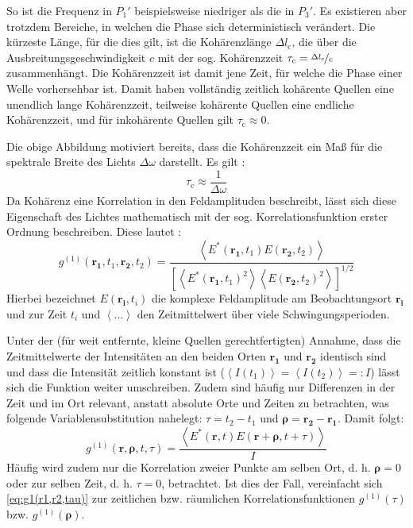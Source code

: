 So ist die Frequenz in $P_1'$ beispielsweise niedriger als die in $P_3'$. 
Es existieren aber trotzdem Bereiche, in welchen die Phase sich deterministisch verändert. 
Die kürzeste Länge, für die dies gilt, ist die Kohärenzlänge $\Delta l_\mathrm{c}$, die über die Ausbreitungsgeschwindigkeit $c$ mit der sog. Kohärenzzeit $\tau_{\mathrm{c}}= \nicefrac{\Delta l_\mathrm{c}}{c}$ zusammenhängt. 
Die Kohärenzzeit ist damit jene Zeit, für welche die Phase einer Welle vorhersehbar ist. 
Damit haben vollständig zeitlich kohärente Quellen eine unendlich lange Kohärenzzeit, teilweise kohärente Quellen eine endliche Kohärenzzeit, und für inkohärente Quellen gilt $\tau_{\mathrm{c}}\approx 0$. 

Die obige Abbildung motiviert bereits, dass die Kohärenzzeit ein Maß für die spektrale Breite des Lichts $\Delta \omega$ darstellt. 
Es gilt \cite{foxQuantumOpticsIntroduction2006}:
\begin{equation}
    \tau_{\mathrm{c}}  \approx \frac{1}{\Delta \omega}
    \label{eq:tau(delta nu)}
\end{equation}
Da Kohärenz eine Korrelation in den Feldamplituden beschreibt, lässt sich diese Eigenschaft des Lichtes mathematisch mit der sog. Korrelationsfunktion erster Ordnung beschreiben. 
Diese lautet \cite{foellmiIntensityInterferometrySecondorder2009}:
\begin{equation}
    g^{(1)}(\mathbf{r_1}, t_1, \mathbf{r_2}, t_2) = \frac{\left<E^*(\mathbf{r_1}, t_1)E(\mathbf{r_2}, t_2)\right>}{\left[\left<E^*(\mathbf{r_1}, t_1)^2\right> \left<E(\mathbf{r_2}, t_2)^2\right>\right]^{1/2}}
    \label{eq:g1(r1,t1,r2,t2)}
\end{equation}
Hierbei bezeichnet $E(\mathbf{r_i},t_i)$ die komplexe Feldamplitude am Beobachtungsort $\mathbf{r_i}$ und zur Zeit $t_i$ und $\left<\dots\right>$ den Zeitmittelwert über viele Schwingungsperioden. 

Unter der (für weit entfernte, kleine Quellen gerechtfertigten) Annahme, dass die Zeitmittelwerte der Intensitäten an den beiden Orten $\mathbf{r_1}$ und $\mathbf{r_2}$ identisch sind und dass die Intensität zeitlich konstant ist ($\left<I(t_1)\right>=\left<I(t_2)\right>=:I$) lässt sich die Funktion weiter umschreiben. 
Zudem sind häufig nur Differenzen in der Zeit und im Ort relevant, anstatt absolute Orte und Zeiten zu betrachten, was folgende Variablensubstitution nahelegt: $\tau = t_2 -t_1$ und $\bm{\rho} = \mathbf{r_2} - \mathbf{r_1}$. 
Damit folgt:
\begin{equation}
    g^{(1)}(\mathbf{r}, \bm{\rho}, t, \tau) = \frac{\left<E^*(\mathbf{r}, t)E(\mathbf{r}+\bm{\rho}, t+\tau)\right>}{I}
    \label{eq:g1(r1,r2,tau)}
\end{equation}
Häufig wird zudem nur die Korrelation zweier Punkte am selben Ort, d. h. $\bm{\rho}=0$ oder zur selben Zeit, d. h. $\tau=0$, betrachtet. 
Ist dies der Fall, vereinfacht sich \autoref{eq:g1(r1,r2,tau)} zur zeitlichen bzw. räumlichen Korrelationsfunktionen $g^{(1)}(\tau)$ bzw. $g^{(1)}(\bm{\rho})$.


